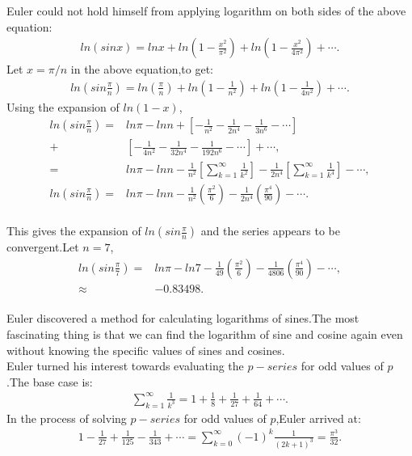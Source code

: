 \documentclass[a4paper,reqno,11pt]{book}
\theoremstyle{plain}%
\theoremstyle{definition}
\begin{document}
\noindent Euler could not hold himself from applying logarithm on both sides of the above equation:
\begin{eqnarray*}
    ln(sinx)=lnx+ln\left(1-\frac{x^2}{\pi^2}\right)+ln\left(1-\frac{x^2}{4\pi^2}\right)+\cdots.
\end{eqnarray*}
Let $x=\pi/n$ in the above equation,to get:
\begin{eqnarray*}
    ln\left(sin\frac{\pi}{n}\right)=ln\left(\frac{\pi}{n}\right)+ln\left(1-\frac{1}{n^2}\right)+ln\left(1-\frac{1}{4n^2}\right)+\cdots.
\end{eqnarray*}
Using the expansion of $ln(1-x)$,
\begin{align*}
    ln\left(sin\frac{\pi}{n}\right)=&ln\pi-lnn+\left[-\frac{1}{n^2}-\frac{1}{2n^4}-\frac{1}{3n^6}-\cdots\right]\\+&\left[-\frac{1}{4n^2}-\frac{1}{32n^4}-\frac{1}{192n^6}-\cdots\right]+\cdots,\\
    =&ln\pi-lnn-\frac{1}{n^2}\left[\sum_{k=1}^{\infty}\frac{1}{k^2}\right]-\frac{1}{2n^4}\left[\sum_{k=1}^{\infty}\frac{1}{k^4}\right]-\cdots,\\
    ln\left(sin\frac{\pi}{n}\right)=&ln\pi-lnn-\frac{1}{n^2}\left(\frac{\pi^2}{6}\right)-\frac{1}{2n^4}\left(\frac{\pi^4}{90}\right)-\cdots.
\end{align*}
\\
This gives the expansion of $ln\left(sin\frac{\pi}{n}\right)$ and the series appears to be convergent.Let $n=7$,
\begin{align*}
     ln\left(sin\frac{\pi}{7}\right)=&ln\pi-ln7-\frac{1}{49}\left(\frac{\pi^2}{6}\right)-\frac{1}{4806}\left(\frac{\pi^4}{90}\right)-\cdots,\\
     \approx&-0.83498.
\end{align*}
\\
Euler discovered a method for calculating logarithms of sines.The most fascinating thing is that we can find the logarithm of sine and cosine again even without knowing the specific values of sines and cosines.\\
Euler turned his interest towards evaluating the $p-series$ for odd values of $p$.The base case is:
\begin{eqnarray*}
    \sum_{k=1}^{\infty}\frac{1}{k^3}=1+\frac{1}{8}+\frac{1}{27}+\frac{1}{64}+\cdots.
\end{eqnarray*}
In the process of solving $p-series$ for odd values of $p$,Euler arrived at\cite{ref12}:
\begin{eqnarray*}
    1-\frac{1}{27}+\frac{1}{125}-\frac{1}{343}+\cdots=\sum_{k=0}^{\infty}(-1)^k\frac{1}{(2k+1)^3}=\frac{\pi^3}{32}.
\end{eqnarray*}
\end{document}

